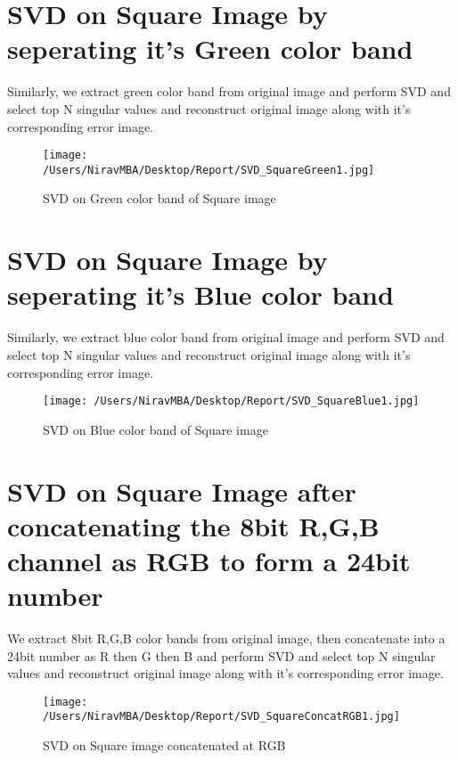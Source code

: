\documentclass[12pt]{report}
\begin{document}
\cleardoublepage
\section{SVD on Square Image by seperating it's Green color band}

Similarly, we extract green color band from original image and perform SVD and select top N singular values and reconstruct original image along with it's corresponding error image.\\


\begin{figure}[H]
	
	\texttt{[image: /Users/NiravMBA/Desktop/Report/SVD\_SquareGreen1.jpg]}
	\caption{SVD on Green color band of Square image}
\end{figure}

\cleardoublepage

\section{SVD on Square Image by seperating it's Blue color band}

Similarly, we extract blue color band from original image and perform SVD and select top N singular values and reconstruct original image along with it's corresponding error image.\\


\begin{figure}[H]
	
	\texttt{[image: /Users/NiravMBA/Desktop/Report/SVD\_SquareBlue1.jpg]}
	\caption{SVD on Blue color band of Square image}
\end{figure}

\cleardoublepage

\section{SVD on Square Image after concatenating the 8bit R,G,B channel as RGB to form a 24bit number }

We extract 8bit R,G,B color bands from original image, then concatenate into a 24bit number as R then G then B and perform SVD and select top N singular values and reconstruct original image along with it's corresponding error image.\\

\begin{figure}[H]
	
	\texttt{[image: /Users/NiravMBA/Desktop/Report/SVD\_SquareConcatRGB1.jpg]}
	\caption{SVD on Square image concatenated at RGB}
\end{figure}
\cleardoublepage
\end{document}
